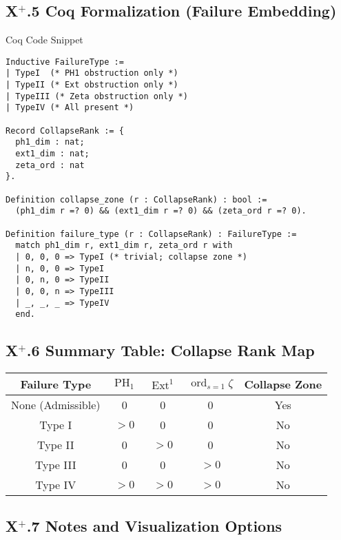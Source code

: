 \documentclass[11pt]{article}
\DeclareMathOperator{\Ext}{Ext}
\DeclareMathOperator{\PH}{PH}
\newcommand{\ord}{\operatorname{ord}}
\begin{document}
\subsection*{X$^+$.5 Coq Formalization (Failure Embedding)}
\begin{subsection}{Coq Code Snippet}
\begin{lstlisting}[language=Coq, caption=Collapse Failure Rank Vector]
Inductive FailureType :=
| TypeI  (* PH1 obstruction only *)
| TypeII (* Ext obstruction only *)
| TypeIII (* Zeta obstruction only *)
| TypeIV (* All present *)

Record CollapseRank := {
  ph1_dim : nat;
  ext1_dim : nat;
  zeta_ord : nat
}.

Definition collapse_zone (r : CollapseRank) : bool :=
  (ph1_dim r =? 0) && (ext1_dim r =? 0) && (zeta_ord r =? 0).

Definition failure_type (r : CollapseRank) : FailureType :=
  match ph1_dim r, ext1_dim r, zeta_ord r with
  | 0, 0, 0 => TypeI (* trivial; collapse zone *)
  | n, 0, 0 => TypeI
  | 0, n, 0 => TypeII
  | 0, 0, n => TypeIII
  | _, _, _ => TypeIV
  end.
\end{lstlisting}
\end{subsection}

\subsection*{X$^+$.6 Summary Table: Collapse Rank Map}

\begin{center}
\begin{tabular}{|c|c|c|c|c|}
\hline
\textbf{Failure Type} & \textbf{$\PH_1$} & \textbf{$\Ext^1$} & \textbf{$\ord_{s=1} \zeta$} & \textbf{Collapse Zone} \\
\hline
None (Admissible) & 0 & 0 & 0 & Yes \\
Type I & $>0$ & 0 & 0 & No \\
Type II & 0 & $>0$ & 0 & No \\
Type III & 0 & 0 & $>0$ & No \\
Type IV & $>0$ & $>0$ & $>0$ & No \\
\hline
\end{tabular}
\end{center}

\subsection*{X$^+$.7 Notes and Visualization Options}
\end{document}
